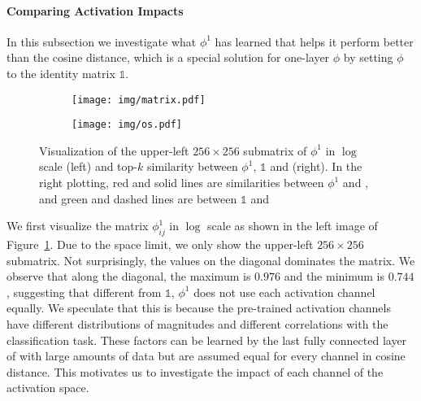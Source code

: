 \paragraph{Comparing Activation Impacts}\label{sec:cai}
In this subsection we investigate what $\phi^1$ has learned that helps it perform better than the cosine distance, which is a special solution for one-layer $\phi$ by setting $\phi$ to the identity matrix $\mathds{1}$.
\begin{figure}
    \begin{subfigure}{.455\linewidth}
        \hspace{-0.2in}\vspace{0.1in}
        \texttt{[image: img/matrix.pdf]}
    \end{subfigure}
    \vrule
    \begin{subfigure}{.53\linewidth}
        \hspace{0.05in}
        \texttt{[image: img/os.pdf]}
    \end{subfigure}
    \caption{Visualization of the upper-left $256\times256$ submatrix of $\phi^1$ in $\log$ scale (left) and top-$k$ similarity between $\phi^1$, $\mathds{1}$ and  (right). In the right plotting, red and solid lines are similarities between $\phi^1$ and , and green and dashed lines are between $\mathds{1}$ and }
    \label{fig:vis}
\end{figure}
We first visualize the matrix $\phi^1_{ij}$ in $\log$ scale as shown in the left image of Figure~\ref{fig:vis}. Due to the space limit, we only show the upper-left $256\times256$ submatrix. Not surprisingly, the values on the diagonal dominates the matrix.
We observe that along the diagonal, the maximum is $0.976$ and the minimum is $0.744$, suggesting that different from $\mathds{1}$, $\phi^1$ does not use each activation channel equally.
We speculate that this is because the pre-trained activation channels have different distributions of magnitudes and different correlations with the classification task.
These factors can be learned by the last fully connected layer of  with large amounts of data but are assumed equal for every channel in cosine distance.
This motivates us to investigate the impact of each channel of the activation space.

